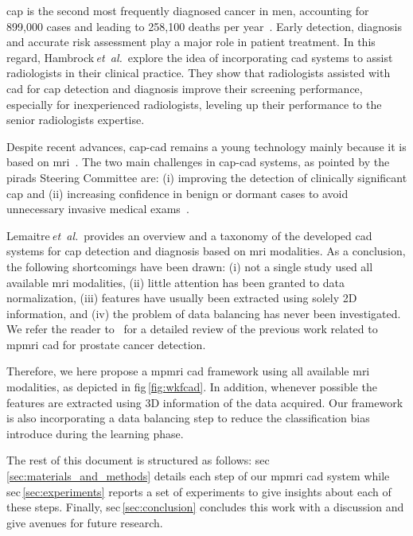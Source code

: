 \documentclass[final,3p,times,twocolumn]{elsarticle}
\begin{document}
\Ac{cap} is the second most frequently diagnosed cancer in men, accounting for
899,000 cases and leading to 258,100 deaths per
year~\citep{ferlay2010estimates}. Early detection, diagnosis and accurate risk
assessment play a major role in patient treatment. In this regard,
Hambrock\,\emph{et~al.}\,\cite{Hambrock2013} explore the idea of incorporating
\ac{cad} systems to assist radiologists in their clinical practice. They show
that radiologists assisted with \ac{cad} for \ac{cap} detection and diagnosis
improve their screening performance, especially for inexperienced radiologists,
leveling up their performance to the senior radiologists expertise.

Despite recent advances, \ac{cap}-\ac{cad} remains a young technology mainly
because it is based on \ac{mri}~\cite{Hegde2013}. The two main challenges in
\ac{cap}-\ac{cad} systems, as pointed by the \ac{pirads} Steering Committee
are: (i) improving the detection of clinically significant \ac{cap} and (ii)
increasing confidence in benign or dormant cases to avoid unnecessary invasive
medical exams~\citep{weinreb2016pi}.

Lemaitre\,\emph{et~al.}\,\cite{lemaitre2015computer} provides an
overview and a taxonomy of the developed \acs{cad} systems for \ac{cap}
detection and diagnosis based on \ac{mri} modalities. As a conclusion, the
following shortcomings have been drawn: (i) not a single study used all available
\ac{mri} modalities, (ii) little attention has been granted to data
normalization, (iii) features have usually been extracted using solely 2D
information, and (iv) the problem of data balancing has never been
investigated. We refer the reader to~\cite{lemaitre2015computer} for a detailed
review of the previous work related to \ac{mpmri} \ac{cad} for prostate cancer
detection.

Therefore, we here propose a \ac{mpmri} \ac{cad} framework using all available
\ac{mri} modalities, as depicted in \acs{fig}\,\ref{fig:wkfcad}. In addition,
whenever possible the features are extracted using 3D information of the data
acquired. Our framework is also incorporating a data balancing step to reduce
the classification bias introduce during the learning phase.

The rest of this document is structured as follows:
\acs{sec}\,\ref{sec:materials_and_methods} details each step of our \ac{mpmri}
\ac{cad} system while \acs{sec}\,\ref{sec:experiments} reports a set of
experiments to give insights about each of these steps. Finally,
\ac{sec}\,\ref{sec:conclusion} concludes this work with a discussion and give
avenues for future research.
\end{document}
